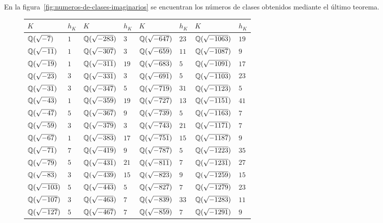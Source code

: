 En la figura~\ref{fig:numeros-de-clases-imaginarios} se encuentran los números
de clases obtenidos mediante el último teorema.

\begin{figure}
  \begin{center}\renewcommand{\arraystretch}{1.5}
    \begin{tabular}{x{2cm}x{1cm}x{2cm}x{1cm}x{2cm}x{1cm}x{2cm}x{1cm}}
      \hline
      $K$ & $h_K$ & $K$ & $h_K$ & $K$ & $h_K$ & $K$ & $h_K$ \tabularnewline\hline
      $\mathbb{Q} (\sqrt{-7})$ & $1$ & $\mathbb{Q} (\sqrt{-283})$ & $3$ & $\mathbb{Q} (\sqrt{-647})$ & $23$ & $\mathbb{Q} (\sqrt{-1063})$ & $19$ \tabularnewline\hline
      $\mathbb{Q} (\sqrt{-11})$ & $1$ & $\mathbb{Q} (\sqrt{-307})$ & $3$ & $\mathbb{Q} (\sqrt{-659})$ & $11$ & $\mathbb{Q} (\sqrt{-1087})$ & $9$ \tabularnewline\hline
      $\mathbb{Q} (\sqrt{-19})$ & $1$ & $\mathbb{Q} (\sqrt{-311})$ & $19$ & $\mathbb{Q} (\sqrt{-683})$ & $5$ & $\mathbb{Q} (\sqrt{-1091})$ & $17$ \tabularnewline\hline
      $\mathbb{Q} (\sqrt{-23})$ & $3$ & $\mathbb{Q} (\sqrt{-331})$ & $3$ & $\mathbb{Q} (\sqrt{-691})$ & $5$ & $\mathbb{Q} (\sqrt{-1103})$ & $23$ \tabularnewline\hline
      $\mathbb{Q} (\sqrt{-31})$ & $3$ & $\mathbb{Q} (\sqrt{-347})$ & $5$ & $\mathbb{Q} (\sqrt{-719})$ & $31$ & $\mathbb{Q} (\sqrt{-1123})$ & $5$ \tabularnewline\hline
      $\mathbb{Q} (\sqrt{-43})$ & $1$ & $\mathbb{Q} (\sqrt{-359})$ & $19$ & $\mathbb{Q} (\sqrt{-727})$ & $13$ & $\mathbb{Q} (\sqrt{-1151})$ & $41$ \tabularnewline\hline
      $\mathbb{Q} (\sqrt{-47})$ & $5$ & $\mathbb{Q} (\sqrt{-367})$ & $9$ & $\mathbb{Q} (\sqrt{-739})$ & $5$ & $\mathbb{Q} (\sqrt{-1163})$ & $7$ \tabularnewline\hline
      $\mathbb{Q} (\sqrt{-59})$ & $3$ & $\mathbb{Q} (\sqrt{-379})$ & $3$ & $\mathbb{Q} (\sqrt{-743})$ & $21$ & $\mathbb{Q} (\sqrt{-1171})$ & $7$ \tabularnewline\hline
      $\mathbb{Q} (\sqrt{-67})$ & $1$ & $\mathbb{Q} (\sqrt{-383})$ & $17$ & $\mathbb{Q} (\sqrt{-751})$ & $15$ & $\mathbb{Q} (\sqrt{-1187})$ & $9$ \tabularnewline\hline
      $\mathbb{Q} (\sqrt{-71})$ & $7$ & $\mathbb{Q} (\sqrt{-419})$ & $9$ & $\mathbb{Q} (\sqrt{-787})$ & $5$ & $\mathbb{Q} (\sqrt{-1223})$ & $35$ \tabularnewline\hline
      $\mathbb{Q} (\sqrt{-79})$ & $5$ & $\mathbb{Q} (\sqrt{-431})$ & $21$ & $\mathbb{Q} (\sqrt{-811})$ & $7$ & $\mathbb{Q} (\sqrt{-1231})$ & $27$ \tabularnewline\hline
      $\mathbb{Q} (\sqrt{-83})$ & $3$ & $\mathbb{Q} (\sqrt{-439})$ & $15$ & $\mathbb{Q} (\sqrt{-823})$ & $9$ & $\mathbb{Q} (\sqrt{-1259})$ & $15$ \tabularnewline\hline
      $\mathbb{Q} (\sqrt{-103})$ & $5$ & $\mathbb{Q} (\sqrt{-443})$ & $5$ & $\mathbb{Q} (\sqrt{-827})$ & $7$ & $\mathbb{Q} (\sqrt{-1279})$ & $23$ \tabularnewline\hline
      $\mathbb{Q} (\sqrt{-107})$ & $3$ & $\mathbb{Q} (\sqrt{-463})$ & $7$ & $\mathbb{Q} (\sqrt{-839})$ & $33$ & $\mathbb{Q} (\sqrt{-1283})$ & $11$ \tabularnewline\hline
      $\mathbb{Q} (\sqrt{-127})$ & $5$ & $\mathbb{Q} (\sqrt{-467})$ & $7$ & $\mathbb{Q} (\sqrt{-859})$ & $7$ & $\mathbb{Q} (\sqrt{-1291})$ & $9$ \tabularnewline\hline

\end{tabular}
\end{center}
\end{figure}
